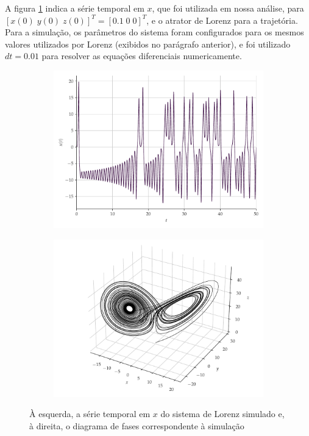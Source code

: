 \documentclass[a4paper, 12pt]{article}
\begin{document}
A figura \ref{fig:lorenz} indica a série temporal em $x$, que foi utilizada em nossa análise, para $[x(0)\; y(0)\; z(0)]^T = [0.1\; 0\; 0]^T$, e o atrator de Lorenz para a trajetória. Para a simulação, os parâmetros do sistema foram configurados para os mesmos valores utilizados por Lorenz (exibidos no parágrafo anterior), e foi utilizado $dt = 0.01$ para resolver as equações diferenciais numericamente.
\begin{figure}[H]
     \begin{subfigure}[t]{0.35\textwidth} 
         \includegraphics[scale=0.35]{serie-lorenz-x.pdf}
     \end{subfigure}
     \centering
     \begin{subfigure}[t]{0.35\textwidth}
         \includegraphics[scale=0.35]{diagrama-de-fases-lorenz.pdf}
     \end{subfigure}
     \caption{À esquerda, a série temporal em $x$ do sistema de Lorenz simulado e, à direita, o diagrama de fases correspondente à simulação}
     \label{fig:lorenz}
\end{figure}
\end{document}
